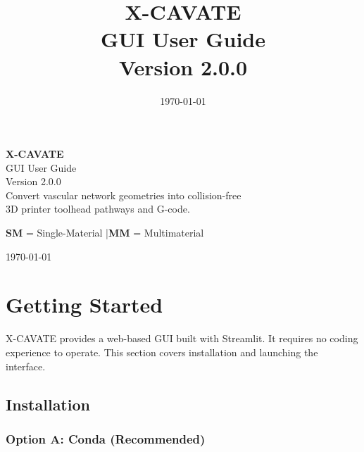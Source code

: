 \documentclass[11pt,letterpaper]{article}
\title{
    \vspace{-1cm}
    \textbf{\Huge X-CAVATE}\\[8pt]
    \LARGE GUI User Guide\\[6pt]
    \large Version 2.0.0
}
\author{}
\date{\today}
\begin{document}
\begin{titlepage}
\centering
\vspace*{3cm}

{\Huge \textbf{X-CAVATE}}\\[12pt]
{\LARGE GUI User Guide}\\[20pt]
{\large Version 2.0.0}\\[40pt]

{\large Convert vascular network geometries into collision-free\\[4pt]
3D printer toolhead pathways and G-code.}

\vspace{2cm}

{\normalsize
\textbf{SM} = Single-Material \quad|\quad \textbf{MM} = Multimaterial
}

\vfill

{\normalsize \today}

\end{titlepage}

\tableofcontents
\newpage

\section{Getting Started}

X-CAVATE provides a web-based GUI built with Streamlit. It requires no coding
experience to operate. This section covers installation and launching the
interface.

\subsection{Installation}

\subsubsection{Option A: Conda (Recommended)}
\end{document}
